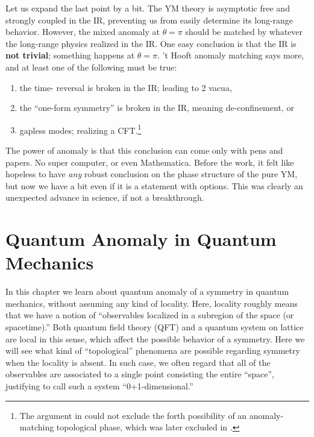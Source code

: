 \documentclass[
]{scrartcl}
\providecommand{\tightlist}{%
  \setlength{\itemsep}{0pt}\setlength{\parskip}{0pt}}
\numberwithin{equation}{section}
\theoremstyle{definition}
\theoremstyle{definition}
\theoremstyle{definition}
\theoremstyle{definition}
\theoremstyle{remark}
\begin{document}
Let us expand the last point by a bit. The YM theory is asymptotic free and strongly coupled in the IR, preventing us from easily determine its long-range behavior.
However, the mixed anomaly at \(\theta = \pi\) should be matched by whatever the long-range physics realized in the IR. One easy conclusion is that the IR is \textbf{not trivial}; something happens at \(\theta = \pi\). 't Hooft anomaly matching says more, and at least one of the following must be true:

\begin{enumerate}
\def\labelenumi{\arabic{enumi}.}
\tightlist
\item
  the time- reversal is broken in the IR; leading to 2 vacua,
\item
  the ``one-form symmetry'' is broken in the IR, meaning de-confinement, or
\item
  gapless modes; realizing a CFT.\footnote{The argument in \textcite{Gaiotto:2017yup} could not exclude the forth possibility of an anomaly-matching topological phase, which was later excluded in \textcite{Cordova:2019bsd}.}
\end{enumerate}

The power of anomaly is that this conclusion can come only with pens and papers. No super computer, or even Mathematica.
Before the work, it felt like hopeless to have \emph{any} robust conclusion on the phase structure of the pure YM, but now we have a bit even if it is a statement with options.
This was clearly an unexpected advance in science, if not a breakthrough.

\hypertarget{quantum-anomaly-in-quantum-mechanics}{%
\section{Quantum Anomaly in Quantum Mechanics}\label{quantum-anomaly-in-quantum-mechanics}}

In this chapter we learn about quantum anomaly of a symmetry in quantum mechanics, without assuming any kind of locality.
Here, locality roughly means that we have a notion of ``observables localized in a subregion of the space (or spacetime).''
Both quantum field theory (QFT) and a quantum system on lattice are local in this sense, which affect the possible behavior of a symmetry.
Here we will see what kind of ``topological'' phenomena are possible regarding symmetry when the locality is absent.
In such case, we often regard that all of the observables are associated to a single point consisting the entire ``space'', justifying to call such a system ``0+1-dimensional.''
\end{document}
